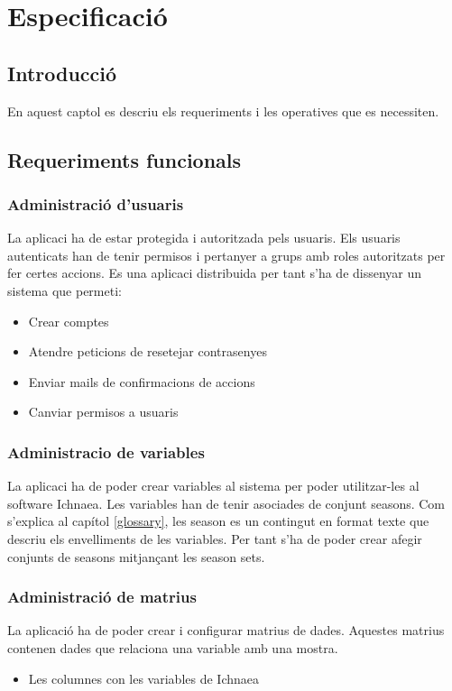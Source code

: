 \chapter{Especificaci\'{o}}
\label{cha:background}

\section{Introducci\'{o}}
En aquest captol es descriu els requeriments i les operatives que es necessiten.
\section{Requeriments funcionals}
\subsection{Administraci\'{o} d'usuaris}
La aplicaci ha de estar protegida i autoritzada pels usuaris. Els usuaris autenticats han de tenir permisos i  pertanyer a grups amb roles autoritzats per fer certes accions. Es una aplicaci distribuida per tant s'ha de dissenyar un sistema que permeti:
\begin{itemize}
\item Crear comptes
\item Atendre peticions de resetejar contrasenyes
\item Enviar mails de confirmacions de accions
\item Canviar permisos a usuaris
\end{itemize}

\subsection{Administracio de variables}
La aplicaci ha de poder crear variables al sistema per poder utilitzar-les al software Ichnaea. Les variables han de tenir asociades de conjunt seasons. Com s'explica al cap\'{i}tol \ref{glossary}, les season es un contingut en format texte que descriu els envelliments de les variables. Per tant s'ha de poder crear afegir conjunts de seasons mitjançant les season sets.

\subsection{Administraci\'{o} de matrius}
La aplicaci\'{o} ha de poder crear i configurar matrius de dades. Aquestes matrius contenen dades que relaciona una variable amb una mostra.
\begin{itemize}
\item Les columnes con les variables de Ichnaea
\end{itemize}

